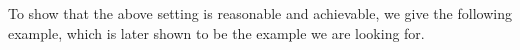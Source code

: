 




To show that the above setting is reasonable and achievable, we give the following example, which is later shown to be the example we are looking for.

